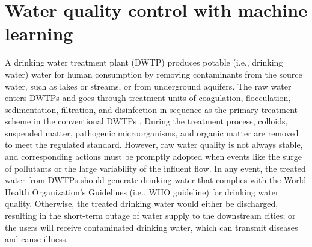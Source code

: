 \section{Water quality control with machine learning}
 
A drinking water treatment plant (DWTP) produces potable (i.e., drinking water) water for human consumption by removing contaminants from the source water, such as lakes or streams, or from underground aquifers. The raw water enters DWTPs and goes through treatment units of coagulation, flocculation, sedimentation, filtration, and disinfection in sequence as the primary treatment scheme in the conventional DWTPs \citep{liRecentAdvancesArtificial2021}. During the treatment process, colloids, suspended matter, pathogenic microorganisms, and organic matter are removed to meet the regulated standard. However, raw water quality is not always stable, and corresponding actions must be promptly adopted when events like the surge of pollutants or the large variability of the influent flow. In any event, the treated water from DWTPs should generate drinking water that complies with the World Health Organization's Guidelines (i.e., WHO guideline) for drinking water quality. Otherwise, the treated drinking water would either be discharged,  resulting in the short-term outage of water supply to the downstream cities; or the users will receive contaminated drinking water, which can transmit diseases and cause illness.

